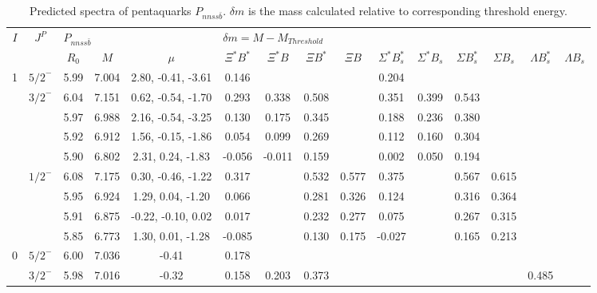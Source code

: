 \documentclass[prd,twocolumn,floatfix,nofootinbib]{revtex4}
\begin{document}
\renewcommand{\tabcolsep}{0.15cm}
\renewcommand{\arraystretch}{1.0}
\begin{table*}[!htbp]
    \caption{Predicted spectra of pentaquarks $P_{nnss\bar{b}}$.
        $\delta m$ is the mass calculated relative to corresponding threshold energy.}
    \label{tab:nnssb}
    \begin{tabular}{cc|ccc|cccccccccc}
        \bottomrule[1.5pt]\bottomrule[0.5pt]
        \multirow{2}{*}{$I$} &\multirow{2}{*}{$J^{P}$} 
        &\multicolumn{3}{l|}{$P_{nnss\bar{b}}$} 
        &\multicolumn{10}{l}{$\delta m=M-M_{Threshold}$} \\
        & &$R_{0}$ &$M$ &$\mu$ 
        &$\Xi^{\ast} B^{\ast}$ &$\Xi^{\ast} B$ &$\Xi B^{\ast}$ &$\Xi B$ 
        &$\Sigma^{\ast} B^{\ast}_{s}$ &$\Sigma^{\ast} B_{s}$ &$\Sigma B^{\ast}_{s}$ &$\Sigma B_{s}$ 
        &$\Lambda B^{\ast}_{s}$ &$\Lambda B_{s}$ \\ \hline
        1
            &${5/2}^{-}$    &5.99   &7.004  &2.80, -0.41, -3.61 &0.146 & & & &0.204 & & & & & \\
            &${3/2}^{-}$    &6.04   &7.151  &0.62, -0.54, -1.70 &0.293 &0.338 &0.508 & &0.351 &0.399 &0.543 & & & \\
            &               &5.97   &6.988  &2.16, -0.54, -3.25 &0.130 &0.175 &0.345 & &0.188 &0.236 &0.380 & & & \\
            &               &5.92   &6.912  &1.56, -0.15, -1.86 &0.054 &0.099 &0.269 & &0.112 &0.160 &0.304 & & & \\
            &               &5.90   &6.802  &2.31, 0.24, -1.83 &-0.056 &-0.011 &0.159 & &0.002 &0.050 &0.194 & & & \\
            &${1/2}^{-}$    &6.08   &7.175  &0.30, -0.46, -1.22 &0.317 & &0.532 &0.577 &0.375 & &0.567 &0.615 & & \\
            &               &5.95   &6.924  &1.29, 0.04, -1.20 &0.066 & &0.281 &0.326 &0.124 & &0.316 &0.364 & & \\
            &               &5.91   &6.875  &-0.22, -0.10, 0.02 &0.017 & &0.232 &0.277 &0.075 & &0.267 &0.315 & & \\
            &               &5.85   &6.773  &1.30, 0.01, -1.28 &-0.085 & &0.130 &0.175 &-0.027 & &0.165 &0.213 & & \\
        0
            &${5/2}^{-}$    &6.00   &7.036  &-0.41 &0.178 & & & & & & & & & \\
            &${3/2}^{-}$    &5.98   &7.016  &-0.32 &0.158 &0.203 &0.373 & & & & & &0.485 & \\

\end{tabular}
\end{table*}
\end{document}
